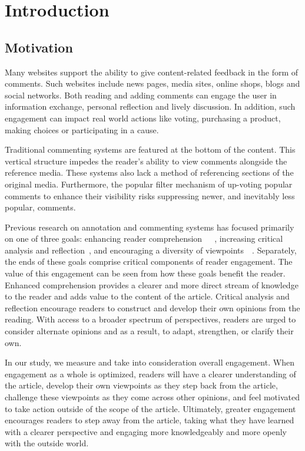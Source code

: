 \section{Introduction}

\subsection{Motivation}

Many websites support the ability to give content-related feedback in the form of comments. Such websites include news pages, media sites, online shops, blogs and social networks. Both reading and adding comments can engage the user in information exchange, personal reflection and lively discussion. In addition, such engagement can impact real world actions like voting, purchasing a product, making choices or participating in a cause.

Traditional commenting systems are featured at the bottom of the content. This vertical structure impedes the reader's ability to view comments alongside the reference media. These systems also lack a method of referencing sections of the original media. Furthermore, the popular filter mechanism of up-voting popular comments to enhance their visibility risks suppressing newer, and inevitably less popular, comments.

Previous research on annotation and commenting systems has focused primarily on one of three goals: enhancing reader comprehension~\cite{NewsInterfaces}~\cite{NB}~\cite{Reflect}, increasing critical analysis and reflection~\cite{AnnotationsStudents}, and encouraging a diversity of viewpoints~\cite{OpinionSpace}~\cite{Politics}. Separately, the ends of these goals comprise critical components of reader engagement. The value of this engagement can be seen from how these goals benefit the reader. 
Enhanced comprehension provides a clearer and more direct stream of knowledge to the reader and adds value to the content of the article. 
Critical analysis and reflection encourage readers to construct and develop their own opinions from the reading. 
With access to a broader spectrum of perspectives, readers are urged to consider alternate opinions and as a result, to adapt, strengthen, or clarify their own. 

In our study, we measure and take into consideration overall engagement. When engagement as a whole is optimized, readers will have a clearer understanding of the article, develop their own viewpoints as they step back from the article, challenge these viewpoints as they come across other opinions, and feel motivated to take action outside of the scope of the article. Ultimately, greater engagement encourages readers to step away from the article, taking what they have learned with a clearer perspective and engaging more knowledgeably and more openly with the outside world.

